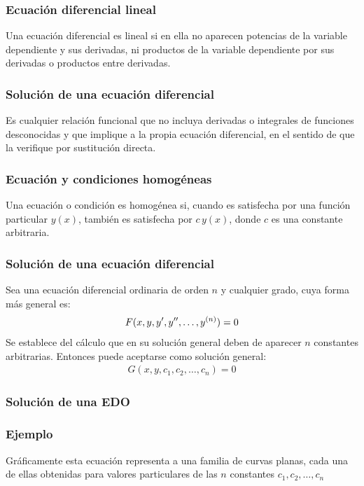 \documentclass[12pt]{beamer}
\begin{document}
\begin{frame}
\frametitle{Ecuación diferencial lineal}
Una ecuación diferencial es lineal si en ella no aparecen potencias de la variable dependiente y sus derivadas, ni productos de la variable dependiente por sus derivadas o productos entre derivadas.
\end{frame}
\begin{frame}
\frametitle{Solución de una ecuación diferencial}
Es cualquier relación funcional que no incluya derivadas o integrales de funciones desconocidas y que implique a la propia ecuación diferencial, en el sentido de que la verifique por sustitución directa.
\end{frame}
\begin{frame}
\frametitle{Ecuación y condiciones homogéneas}
Una ecuación o condición es homogénea si, cuando es satisfecha por una función particular $y (x)$, también es satisfecha por $c \, y(x)$, donde $c$ es una constante arbitraria.
\end{frame}
\begin{frame}
\frametitle{Solución de una ecuación diferencial}
Sea una ecuación diferencial ordinaria de orden $n$ y cualquier grado, cuya forma más general es:
\pause
\begin{align*}
F (x, y, {y}^{\prime}, {y}^{\prime \prime}, \ldots, y^{(n)}) = 0
\end{align*}
\pause
Se establece del cálculo que en su solución general deben de aparecer $n$ constantes arbitrarias. \pause Entonces puede aceptarse como solución general:
\pause
\begin{align*}
G (x,y , c_{1}, c_{2}, \ldots, c_{n}) = 0
\end{align*}
\end{frame}
\begin{frame}[fragile]
\frametitle{Solución de una EDO}
\end{frame}
\begin{frame}
\frametitle{Ejemplo}
Gráficamente esta ecuación representa a una familia de curvas planas, cada una de ellas obtenidas para valores particulares de las $n$ constantes $c_{1}, c_{2}, \ldots, c_{n}$
\end{frame}
\end{document}
